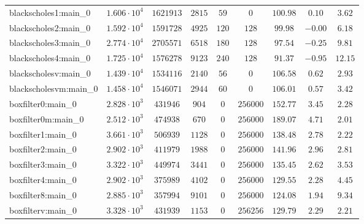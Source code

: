 \begin{tabular}{|l|c|c|c|c|c|c|c|c|}
blackscholes1:main\_0          & $ 1.606 \cdot 10^{4} $ & $ 1621913  $ & $ 2815   $ & $ 59   $ & $ 0        $ & $ 100.98      $ & $ 0.10    $ & $ 3.62    $ \\
blackscholes2:main\_0          & $ 1.592 \cdot 10^{4} $ & $ 1591728  $ & $ 4925   $ & $ 120  $ & $ 128      $ & $ 99.98       $ & $ -0.00   $ & $ 6.18    $ \\
blackscholes3:main\_0          & $ 2.774 \cdot 10^{4} $ & $ 2705571  $ & $ 6518   $ & $ 180  $ & $ 128      $ & $ 97.54       $ & $ -0.25   $ & $ 9.81    $ \\
blackscholes4:main\_0          & $ 1.725 \cdot 10^{4} $ & $ 1576278  $ & $ 9123   $ & $ 240  $ & $ 128      $ & $ 91.37       $ & $ -0.95   $ & $ 12.15   $ \\
blackscholesv:main\_0          & $ 1.439 \cdot 10^{4} $ & $ 1534116  $ & $ 2140   $ & $ 56   $ & $ 0        $ & $ 106.58      $ & $ 0.62    $ & $ 2.93    $ \\
blackscholesvm:main\_0         & $ 1.458 \cdot 10^{4} $ & $ 1546071  $ & $ 2944   $ & $ 60   $ & $ 0        $ & $ 106.01      $ & $ 0.57    $ & $ 3.42    $ \\
boxfilter0:main\_0             & $ 2.828 \cdot 10^{3} $ & $ 431946   $ & $ 904    $ & $ 0    $ & $ 256000   $ & $ 152.77      $ & $ 3.45    $ & $ 2.28    $ \\
boxfilter0m:main\_0            & $ 2.512 \cdot 10^{3} $ & $ 474938   $ & $ 670    $ & $ 0    $ & $ 256000   $ & $ 189.07      $ & $ 4.71    $ & $ 2.01    $ \\
boxfilter1:main\_0             & $ 3.661 \cdot 10^{3} $ & $ 506939   $ & $ 1128   $ & $ 0    $ & $ 256000   $ & $ 138.48      $ & $ 2.78    $ & $ 2.22    $ \\
boxfilter2:main\_0             & $ 2.902 \cdot 10^{3} $ & $ 411979   $ & $ 1988   $ & $ 0    $ & $ 256000   $ & $ 141.96      $ & $ 2.96    $ & $ 2.81    $ \\
boxfilter3:main\_0             & $ 3.322 \cdot 10^{3} $ & $ 449974   $ & $ 3441   $ & $ 0    $ & $ 256000   $ & $ 135.45      $ & $ 2.62    $ & $ 3.53    $ \\
boxfilter4:main\_0             & $ 2.902 \cdot 10^{3} $ & $ 375989   $ & $ 4102   $ & $ 0    $ & $ 256000   $ & $ 129.55      $ & $ 2.28    $ & $ 4.45    $ \\
boxfilter8:main\_0             & $ 2.885 \cdot 10^{3} $ & $ 357994   $ & $ 9101   $ & $ 0    $ & $ 256000   $ & $ 124.08      $ & $ 1.94    $ & $ 9.34    $ \\
boxfilterv:main\_0             & $ 3.328 \cdot 10^{3} $ & $ 431939   $ & $ 1153   $ & $ 0    $ & $ 256256   $ & $ 129.79      $ & $ 2.29    $ & $ 2.21    $ \\

\end{tabular}
